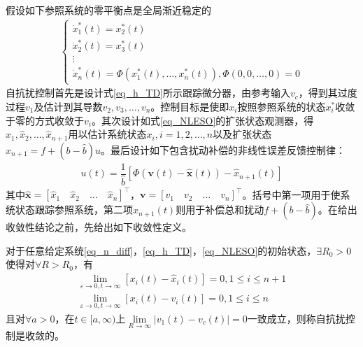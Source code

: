 假设如下参照系统的零平衡点是全局渐近稳定的
\begin{align}\left\{\begin{array}{l}
\dot{x}_{1}^{*}(t)=x_{2}^{*}(t) \\
\dot{x}_{2}^{*}(t)=x_{3}^{*}(t) \\
\vdots \\
\dot{x}_{n}^{*}(t)=\Phi\left(x_{1}^{*}(t), \ldots, x_{n}^{*}(t)\right), \Phi(0,0, \ldots, 0)=0
\end{array}\right.	\label{eq_ref_sys}
\end{align}
自抗扰控制首先是设计式\eqref{eq_h_TD}所示跟踪微分器，由参考输入$ v_c $，得到其过度过程$v_1$及估计到其导数$v_2,v_3,\ldots,v_n$。控制目标是使即$x_i$按照参照系统的状态$ x^*_i $收敛于零的方式收敛于$v_i$。其次设计如式\eqref{eq_NLESO}的扩张状态观测器，得$\hat{x}_1,\hat{x}_2,\ldots,\hat{x}_{n+1}$用以估计系统状态$x_i,i=1,2,\ldots,n$以及扩张状态$x_{n+1}=f+(b-\hat{b}) u$。最后设计如下包含扰动补偿的非线性误差反馈控制律：
\begin{align}
u(t)=\dfrac{1}{\hat{b}}\left[\Phi\left(\bm{v}(t)-\hat{\bm{x}}(t)\right)-\hat{x}_{n+1}(t)\right]	\label{eq_feefback}
\end{align}
其中$\hat{\bm{x}}=[\hat{x}_{1} \quad \hat{x}_{2} \quad \ldots \quad \hat{x}_{n}]^\top $，$ \bm{v}=[ v_1 \quad v_2 \quad \ldots \quad v_n]^\top  $。括号中第一项用于使系统状态跟踪参照系统，第二项$ \hat{x}_{n+1}(t) $则用于补偿总和扰动$ f+(b-\hat{b}) $。在给出收敛性结论之前，先给出如下收敛性定义。
\begin{definition}
对于任意给定系统\eqref{eq_n_diff}，\eqref{eq_h_TD}，\eqref{eq_NLESO}的初始状态，$ \exists R_0 >0 $使得对$ \forall R>R_0 $，有
\begin{equation}
\begin{aligned}
\lim_{\varepsilon \rightarrow 0, t \rightarrow \infty}\left[x_{i}(t)-\hat{x}_{i}(t)\right]=0,1 \leq i \leq n+1 \\
\lim_{\varepsilon \rightarrow 0, t \rightarrow \infty}\left[x_{i}(t)-v_{i}(t)\right]=0,1 \leq i \leq n
\end{aligned}
\end{equation}
%
%
%
且对$ \forall a>0 $，在$t \in [a,\infty)$上$\lim\limits_{R \rightarrow \infty}\left|v_{1}(t)-v_c(t)\right|=0$一致成立，则称自抗扰控制是收敛的。
\end{definition}

